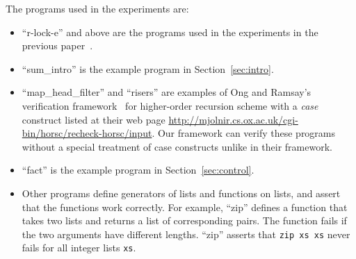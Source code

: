 The programs used in the experiments are:
\begin{itemize}
\item ``r-lock-e'' and above are the programs used in the experiments in
      the previous paper~\cite{KobayashiPLDI2011}.
\item ``sum\_intro'' is the example program in Section~\ref{sec:intro}.
\item ``map\_head\_filter'' and ``risers'' are examples of Ong and
      Ramsay's verification framework~\cite{Ong2011} for higher-order
      recursion scheme with a \textit{case} construct listed at their
      web page
      \url{http://mjolnir.cs.ox.ac.uk/cgi-bin/horsc/recheck-horsc/input}.
      Our framework can verify these programs without a special
      treatment of case constructs unlike in their framework.
\item ``fact'' is the example program in Section~\ref{sec:control}.
\item Other programs define generators of lists and functions on lists,
      and assert that the functions work correctly.  For example,
      ``zip'' defines a function that takes two lists and returns a list of corresponding pairs.
      The function fails if the two arguments have different lengths.
      ``zip'' asserts that \texttt{zip xs xs} never fails for all integer lists \texttt{xs}.
\end{itemize}
